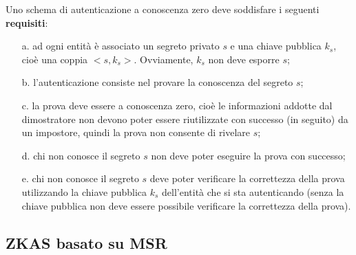 Uno schema di autenticazione a conoscenza zero deve soddisfare i seguenti \textbf{requisiti}: \begin{itemize}
\item[a.] ad ogni entità è associato un segreto privato $s$ e
una chiave pubblica $k_{s}$, cioè una coppia $<s, k_{s}>$. Ovviamente, $k_{s}$ non deve esporre $s$;
\item[b.] l'autenticazione consiste nel provare la conoscenza del segreto $s$;
\item[c.] la prova deve essere a conoscenza zero, cioè le informazioni addotte dal dimostratore non devono poter essere riutilizzate con successo (in seguito) da un impostore, quindi la prova non consente di rivelare $s$;
\item[d.] chi non conosce il segreto $s$ non deve poter eseguire la prova con successo;
\item[e.] chi non conosce il segreto $s$ deve poter verificare la correttezza della prova utilizzando la chiave pubblica $k_{s}$ dell'entità che si sta autenticando (senza la chiave pubblica non deve essere possibile verificare la correttezza della prova).
\end{itemize}

\subsection{ZKAS basato su MSR}

